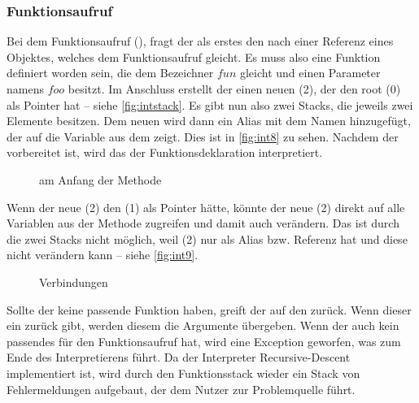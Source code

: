 {    \subsubsection{Funktionsaufruf}
    \label{sssec:Funktionsaufruf}
      Bei dem Funktionsaufruf (), fragt der  als erstes den  nach einer Referenz eines  Objektes, welches dem Funktionsaufruf gleicht. Es muss also eine Funktion definiert worden sein, die dem Bezeichner \myRIn$fun$ gleicht und einen Parameter namens \myRIn$foo$ besitzt. Im Anschluss erstellt der  einen neuen (2), der den root (0) als Pointer hat -- siehe \autoref{fig:intstack}. Es gibt nun also zwei Stacks, die jeweils zwei  Elemente besitzen. Dem neuen  wird dann ein Alias mit dem Namen  hinzugefügt, der auf die  Variable aus dem   zeigt. Dies ist in \autoref{fig:int8} zu sehen. Nachdem der  vorbereitet ist, wird das  der Funktionsdeklaration interpretiert.
      \begin{figure}[H]
        \centering
        \caption{ am Anfang der  Methode}
        \label{fig:int8}
      \end{figure}

      Wenn der neue (2) den  (1) als Pointer hätte, könnte der neue (2) direkt auf alle Variablen aus der  Methode zugreifen und damit auch  verändern. Das ist durch die zwei Stacks nicht möglich, weil (2)  nur als Alias bzw. Referenz hat und diese nicht verändern kann -- siehe \autoref{fig:int9}.
      \begin{figure}[H]
        \centering
        \caption{ Verbindungen}
        \label{fig:intstack}
      \end{figure}

      Sollte der  keine passende Funktion haben, greift der  auf den  zurück. Wenn dieser ein  zurück gibt, werden diesem die Argumente übergeben. Wenn der  auch kein passendes  für den Funktionsaufruf hat, wird eine Exception geworfen, was zum Ende des Interpretierens führt. Da der Interpreter Recursive-Descent implementiert ist, wird durch den Funktionsstack wieder ein Stack von Fehlermeldungen aufgebaut, der dem Nutzer zur Problemquelle führt.

}
